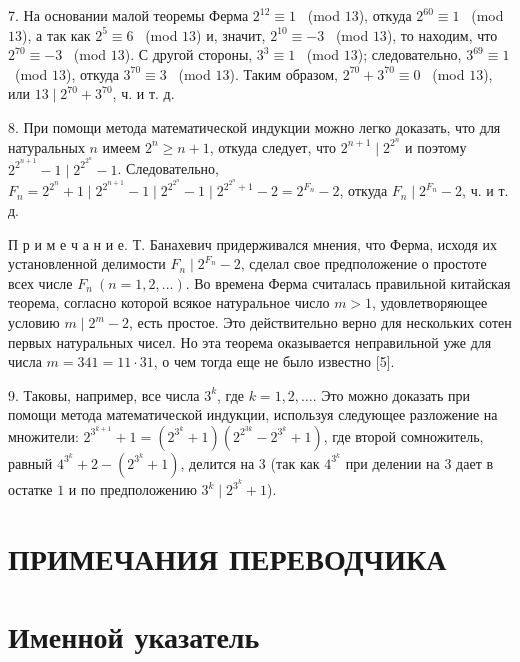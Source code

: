 \documentclass[12pt, a4paper, openany]{book}
\begin{document}
7. На основании малой теоремы Ферма $2^{12}\equiv1$ \ (mod $13$), откуда $2^{60}\equiv1$ \ (mod $13$), а так как $2^{5}\equiv6$ \ (mod $13$) и, значит, $2^{10}\equiv-3$ \ (mod $13$), то находим, что $2^{70}\equiv-3$ \ (mod $13$). С другой стороны, $3^{3}\equiv1$ \ (mod $13$); следовательно, $3^{69}\equiv1$ \ (mod $13$), откуда $3^{70}\equiv3$ \ (mod $13$). Таким образом, $2^{70} + 3^{70}\equiv0$ \ (mod $13$), или $13 \mid 2^{70} + 3^{70}$, ч. и т. д.

8. При помощи метода математической индукции можно легко доказать, что для натуральных $n$ имеем $2^n \geqslant n+1$, откуда следует, что $\displaystyle 2^{n+1} \mid 2^{2^n}$ и поэтому $\displaystyle 2^{2^{n+1}}-1 \mid 2^{2^{2^n}}-1$. Следовательно, $\displaystyle F_n = 2^{2^n} + 1 \mid 2^{2^{n+1}}-1 \mid 2^{2^{2^n}}-1 \mid 2^{2^{2^n}+1}-2 = 2^{F_n}-2$, откуда $\displaystyle F_n \mid 2^{F_n}-2$, ч. и т. д.
	
{\footnotesize 	П р и м е ч а н и е. Т. Банахевич придерживался мнения, что Ферма, исходя их установленной делимости $F_n \mid 2^{F_n}-2$, сделал свое предположение о простоте всех числе $F_n \ (n=1,2,\dots)$. Во времена Ферма считалась правильной китайская теорема, согласно которой всякое натуральное число $m>1$, удовлетворяющее условию $m \mid 2^m-2$, есть простое. Это действительно верно для нескольких сотен первых натуральных чисел. Но эта теорема оказывается неправильной уже для числа $m=341=11 \cdot 31$, о чем тогда еще не было известно [5].}

9. Таковы, например, все числа $3^k$, где $k=1,2, \dots$. Это можно доказать при помощи метода математической индукции, используя следующее разложение на множители: $2^{3^{k+1}}+1=(2^{3^k}+1)(2^{2^{3k}}-2^{3^k}+1)$, где второй сомножитель, равный $4^{3^k}+2 - (2^{3^{k}}+1)$, делится на $3$ (так как $4^{3^k}$ при делении на $3$ дает в остатке $1$ и по предположению $3^k \mid 2^{3^k}+1$).

\newpage

\section[Примечания переводчика]{\center ПРИМЕЧАНИЯ ПЕРЕВОДЧИКА}	
\newpage

\section[Именной указатель]{\center Именной указатель}	
\printindex
	
\end{document}
